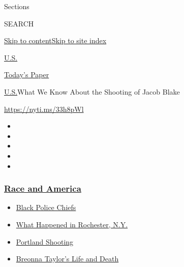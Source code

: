 Sections

SEARCH

\protect\hyperlink{site-content}{Skip to
content}\protect\hyperlink{site-index}{Skip to site index}

\href{https://www.nytimes3xbfgragh.onion/section/us}{U.S.}

\href{https://myaccount.nytimes3xbfgragh.onion/auth/login?response_type=cookie\&client_id=vi}{}

\href{https://www.nytimes3xbfgragh.onion/section/todayspaper}{Today's
Paper}

\href{/section/us}{U.S.}\textbar{}What We Know About the Shooting of
Jacob Blake

\url{https://nyti.ms/33h8pWl}

\begin{itemize}
\item
\item
\item
\item
\item
\end{itemize}

\hypertarget{race-and-america}{%
\subsubsection{\texorpdfstring{\href{https://www.nytimes3xbfgragh.onion/news-event/george-floyd-protests-minneapolis-new-york-los-angeles?name=styln-george-floyd\&region=TOP_BANNER\&block=storyline_menu_recirc\&action=click\&pgtype=Article\&impression_id=a9270080-f4cd-11ea-9ea3-1351fae58b7b\&variant=undefined}{Race
and America}}{Race and America}}\label{race-and-america}}

\begin{itemize}
\tightlist
\item
  \href{https://www.nytimes3xbfgragh.onion/2020/09/11/us/black-police-chiefs-reform.html?name=styln-george-floyd\&region=TOP_BANNER\&block=storyline_menu_recirc\&action=click\&pgtype=Article\&impression_id=a9270081-f4cd-11ea-9ea3-1351fae58b7b\&variant=undefined}{Black
  Police Chiefs}
\item
  \href{https://www.nytimes3xbfgragh.onion/2020/09/04/nyregion/rochester-police-daniel-prude.html?name=styln-george-floyd\&region=TOP_BANNER\&block=storyline_menu_recirc\&action=click\&pgtype=Article\&impression_id=a9272790-f4cd-11ea-9ea3-1351fae58b7b\&variant=undefined}{What
  Happened in Rochester, N.Y.}
\item
  \href{https://www.nytimes3xbfgragh.onion/2020/08/30/us/portland-shooting-explained.html?name=styln-george-floyd\&region=TOP_BANNER\&block=storyline_menu_recirc\&action=click\&pgtype=Article\&impression_id=a9272791-f4cd-11ea-9ea3-1351fae58b7b\&variant=undefined}{Portland
  Shooting}
\item
  \href{https://www.nytimes3xbfgragh.onion/2020/08/30/us/breonna-taylor-police-killing.html?name=styln-george-floyd\&region=TOP_BANNER\&block=storyline_menu_recirc\&action=click\&pgtype=Article\&impression_id=a9272792-f4cd-11ea-9ea3-1351fae58b7b\&variant=undefined}{Breonna
  Taylor's Life and Death}
\end{itemize}

